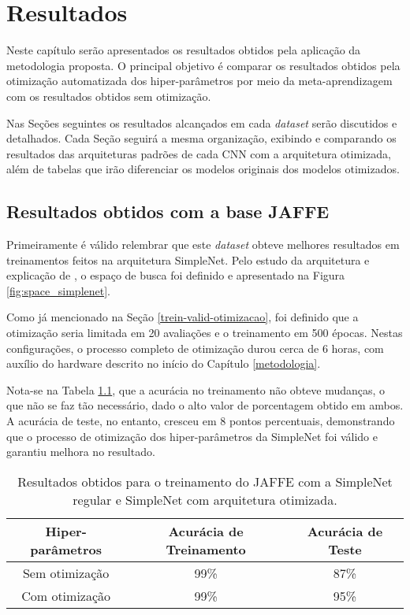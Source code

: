 \documentclass[
12pt,       %
openright,      %
oneside,      %
a4paper,      %
english,      %
french,       %
spanish,      %
brazil        %
]{abntex2}
\begin{document}
\chapter{Resultados} \label{resultados}

Neste capítulo serão apresentados os resultados obtidos pela aplicação da metodologia proposta. O principal objetivo é comparar os resultados obtidos pela otimização automatizada dos hiper-parâmetros por meio da meta-aprendizagem com os resultados obtidos sem otimização.

Nas Seções seguintes os resultados alcançados em cada \textit{dataset} serão discutidos e detalhados. Cada Seção seguirá a mesma organização, exibindo e comparando os resultados das arquiteturas padrões de cada CNN com a arquitetura otimizada, além de tabelas que irão diferenciar os modelos originais dos modelos otimizados.

\section{Resultados obtidos com a base JAFFE} \label{resultados-jaffe}

Primeiramente é válido relembrar que este \textit{dataset} obteve melhores resultados em treinamentos feitos na arquitetura SimpleNet. Pelo estudo da arquitetura e explicação de , o espaço de busca foi definido e apresentado na Figura \ref{fig:space_simplenet}.

Como já mencionado na Seção \ref{trein-valid-otimizacao}, foi definido que a otimização seria limitada em 20 avaliações e o treinamento em 500 épocas. Nestas configurações, o processo completo de otimização durou cerca de 6 horas, com auxílio do hardware descrito no início do Capítulo \ref{metodologia}.

Nota-se na Tabela \ref{tab:resultados-jaffe}, que a acurácia no treinamento não obteve mudanças, o que não se faz tão necessário, dado o alto valor de porcentagem obtido em ambos. A acurácia de teste, no entanto, cresceu em 8 pontos percentuais, demonstrando que o processo de otimização dos hiper-parâmetros da SimpleNet foi válido e garantiu melhora no resultado.

\begin{table}[H]
\centering
\caption{Resultados obtidos para o treinamento do JAFFE com a SimpleNet regular e SimpleNet com arquitetura otimizada.}
\label{tab:resultados-jaffe}
\begin{tabular}{@{}ccc@{}}
\toprule
\textbf{Hiper-parâmetros} & \textbf{Acurácia de Treinamento} & \textbf{Acurácia de Teste} \\ \midrule
Sem otimização            & 99\%              & 87\%               \\
Com otimização            & 99\%              & 95\%               \\ \bottomrule
\end{tabular}
\end{table}
\end{document}
